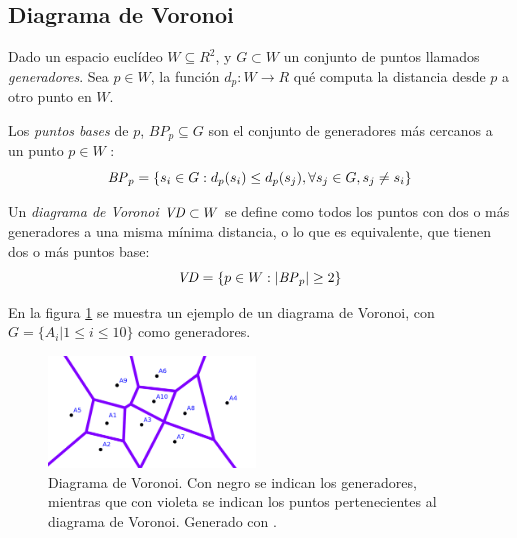 \subsection{Diagrama de Voronoi}\label{sec:VD}
Dado un espacio euclídeo $W \subseteq R^2$, y $G \subset W$ un conjunto de puntos llamados \emph{generadores}. Sea $p\in W$, la función $d_p : W \rightarrow R$ qué computa la distancia desde $p$ a otro punto en $W$. 

Los \emph{puntos bases} de $p$, $BP_p \subseteq G$ son el conjunto de generadores más cercanos a un punto $p \in W$ :
\begin{equation}
  \mathit{BP}_p =\{s_i \in G : d_p(s_i) \leq d_p(s_j), \forall s_j\in G,s_j \neq s_i\}\label{eq:bases}
\end{equation}

Un \emph{diagrama de Voronoi} $\mathit{VD}\subset W$ se define como todos los puntos con dos o más generadores a una misma mínima distancia, o lo que es equivalente, que tienen dos o más puntos base: 
\begin{equation}
  \mathit{VD} = \{p \in W : |\mathit{BP}_p| \geq 2\}\label{eq:VD}
\end{equation}


En la figura \ref{fig:ejemploVoronoi} se muestra un ejemplo de un diagrama de Voronoi, con $G=\{A_i | 1\leq i \leq 10\}$ como generadores.
\begin{figure}[H]
  \center
  \includegraphics[width=5.5cm]{imagenes/VD.png}
  \caption[Diagrama de Voronoi.]{Diagrama de Voronoi. Con negro se indican los generadores, mientras que con violeta se indican los puntos pertenecientes al diagrama de Voronoi. Generado con \cite{voronoigeo}.}\label{fig:ejemploVoronoi}
\end{figure} 

